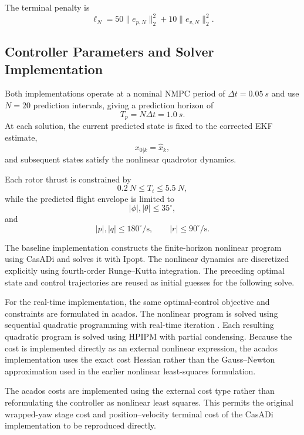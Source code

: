 \documentclass[conference]{IEEEtran}
\begin{document}
The terminal penalty is
\begin{equation}
\ell_N
=
50\|e_{p,N}\|_2^2
+
10\|e_{v,N}\|_2^2.
\label{eq:terminalcost}
\end{equation}

\subsection{Controller Parameters and Solver Implementation}
Both implementations operate at a nominal NMPC period of
$\Delta t=\SI{0.05}{s}$ and use $N=20$ prediction intervals, giving a prediction horizon of
\begin{equation}
T_p=N\Delta t=\SI{1.0}{s}.
\end{equation}
At each solution, the current predicted state is fixed to the corrected EKF estimate,
\begin{equation}
x_{0|k}=\hat{x}_k,
\end{equation}
and subsequent states satisfy the nonlinear quadrotor dynamics.

Each rotor thrust is constrained by
\begin{equation}
\SI{0.2}{N}\le T_i\le\SI{5.5}{N},
\end{equation}
while the predicted flight envelope is limited to
\begin{equation}
|\phi|,|\theta|\le35^\circ,
\end{equation}
and
\begin{equation}
|p|,|q|\le180^\circ/\mathrm{s},
\qquad
|r|\le90^\circ/\mathrm{s}.
\end{equation}

The baseline implementation constructs the finite-horizon nonlinear program using CasADi and solves it with Ipopt. The nonlinear dynamics are discretized explicitly using fourth-order Runge--Kutta integration. The preceding optimal state and control trajectories are reused as initial guesses for the following solve.

For the real-time implementation, the same optimal-control objective and constraints are formulated in acados. The nonlinear program is solved using sequential quadratic programming with real-time iteration . Each resulting quadratic program is solved using HPIPM with partial condensing. Because the cost is implemented directly as an external nonlinear expression, the acados implementation uses the exact cost Hessian rather than the Gauss--Newton approximation used in the earlier nonlinear least-squares formulation.

The acados costs are implemented using the external cost type rather than reformulating the controller as nonlinear least squares. This permits the original wrapped-yaw stage cost and position--velocity terminal cost of the CasADi implementation to be reproduced directly.
\end{document}
